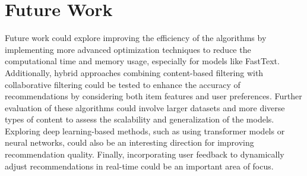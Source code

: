 \documentclass{llncs}
\begin{document}
\section{Future Work}
Future work could explore improving the efficiency of the algorithms by implementing more advanced optimization techniques to reduce the computational time and memory usage, especially for models like FastText. Additionally, hybrid approaches combining content-based filtering with collaborative filtering could be tested to enhance the accuracy of recommendations by considering both item features and user preferences. Further evaluation of these algorithms could involve larger datasets and more diverse types of content to assess the scalability and generalization of the models. Exploring deep learning-based methods, such as using transformer models or neural networks, could also be an interesting direction for improving recommendation quality. Finally, incorporating user feedback to dynamically adjust recommendations in real-time could be an important area of focus.\\\\
%
\end{document}
